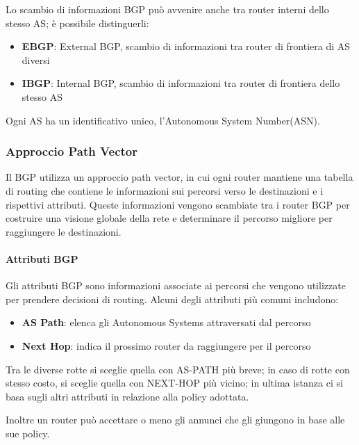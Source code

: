 Lo scambio di informazioni BGP può avvenire anche tra router interni dello stesso AS; è possibile distinguerli:
\begin{itemize}
    \item \textbf{EBGP}: External BGP, scambio di informazioni tra router di frontiera di AS diversi
    \item \textbf{IBGP}: Internal BGP, scambio di informazioni tra router di frontiera dello stesso AS
\end{itemize}
Ogni AS ha un identificativo unico, l'Autonomous System Number(ASN).
\subsubsection{Approccio Path Vector}
Il BGP utilizza un approccio path vector, in cui ogni router mantiene una tabella di routing che contiene le informazioni sui percorsi verso le destinazioni e i rispettivi attributi.
Queste informazioni vengono scambiate tra i router BGP per costruire una visione globale della rete e determinare il percorso migliore per raggiungere le destinazioni.
\paragraph{Attributi BGP}
Gli attributi BGP sono informazioni associate ai percorsi che vengono utilizzate per prendere decisioni di routing. Alcuni degli attributi più comuni includono:
\begin{itemize}
    \item \textbf{AS Path}: elenca gli Autonomous Systems attraversati dal percorso
    \item \textbf{Next Hop}: indica il prossimo router da raggiungere per il percorso
\end{itemize}
Tra le diverse rotte si sceglie quella con AS-PATH più breve; in caso di rotte
con stesso costo, si sceglie quella con NEXT-HOP più vicino; in ultima istanza
ci si basa sugli altri attributi in relazione alla policy adottata.

Inoltre un router può accettare o meno gli annunci che gli giungono in base alle sue
policy.